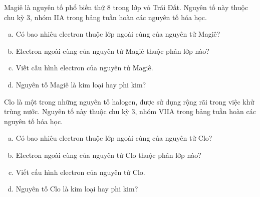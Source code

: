 \begin{bt}
	Magiê là nguyên tố phổ biến thứ 8 trong lớp vỏ Trái Đất. Nguyên tố này thuộc chu kỳ 3, nhóm IIA trong bảng tuần hoàn các nguyên tố hóa học.
	\begin{enumerate}[a)]
		\item Có bao nhiêu electron thuộc lớp ngoài cùng của nguyên tử Magiê?
		\item Electron ngoài cùng của nguyên tử Magiê thuộc phân lớp nào?
		\item Viết cấu hình electron của nguyên tử Magiê.
		\item Nguyên tố Magiê là kim loại hay phi kim?
	\end{enumerate}
\end{bt}
\begin{bt}
	Clo là một trong những nguyên tố halogen, được sử dụng rộng rãi trong việc khử trùng nước. Nguyên tố này thuộc chu kỳ 3, nhóm VIIA trong bảng tuần hoàn các nguyên tố hóa học.
	\begin{enumerate}[a)]
		\item Có bao nhiêu electron thuộc lớp ngoài cùng của nguyên tử Clo?
		\item Electron ngoài cùng của nguyên tử Clo thuộc phân lớp nào?
		\item Viết cấu hình electron của nguyên tử Clo.
		\item Nguyên tố Clo là kim loại hay phi kim?
	\end{enumerate}
\end{bt}
